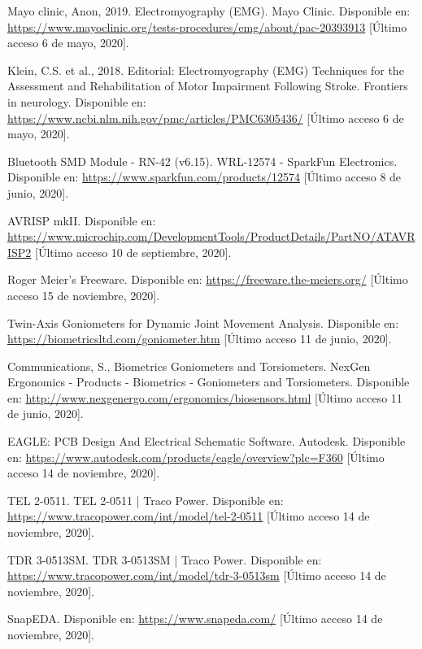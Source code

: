 \begin{thebibliography}{99}
 Mayo clinic, Anon, 2019. Electromyography (EMG). Mayo Clinic. Disponible en: \url{https://www.mayoclinic.org/tests-procedures/emg/about/pac-20393913} [Último acceso 6 de mayo, 2020].

 Klein, C.S. et al., 2018. Editorial: Electromyography (EMG) Techniques for the Assessment and Rehabilitation of Motor Impairment Following Stroke. Frontiers in neurology.  Disponible en: \url{https://www.ncbi.nlm.nih.gov/pmc/articles/PMC6305436/} [Último acceso 6 de mayo, 2020].


 Bluetooth SMD Module - RN-42 (v6.15). WRL-12574 - SparkFun Electronics. Disponible en: \url{https://www.sparkfun.com/products/12574} [Último acceso 8 de junio, 2020].

 AVRISP mkII. Disponible en: \url{https://www.microchip.com/DevelopmentTools/ProductDetails/PartNO/ATAVRISP2} [Último acceso 10 de septiembre, 2020].

 Roger Meier's Freeware. Disponible en: \url{https://freeware.the-meiers.org/} [Último acceso 15 de noviembre, 2020].


 Twin-Axis Goniometers for Dynamic Joint Movement Analysis. Disponible en: \url{https://biometricsltd.com/goniometer.htm} [Último acceso 11 de junio, 2020].

 Communications, S., Biometrics Goniometers and Torsiometers. NexGen Ergonomics - Products - Biometrics - Goniometers and Torsiometers. Disponible en: \url{http://www.nexgenergo.com/ergonomics/biosensors.html} [Último acceso 11 de junio, 2020].

 EAGLE: PCB Design And Electrical Schematic Software. Autodesk. Disponible en: \url{https://www.autodesk.com/products/eagle/overview?plc=F360} [Último acceso 14 de noviembre, 2020].

 TEL 2-0511. TEL 2-0511 | Traco Power. Disponible en: \url{https://www.tracopower.com/int/model/tel-2-0511} [Último acceso 14 de noviembre, 2020].

 TDR 3-0513SM. TDR 3-0513SM | Traco Power. Disponible en: \url{https://www.tracopower.com/int/model/tdr-3-0513sm} [Último acceso 14 de noviembre, 2020].

 SnapEDA. Disponible en: \url{https://www.snapeda.com/} [Último acceso 14 de noviembre, 2020].



\end{thebibliography}
